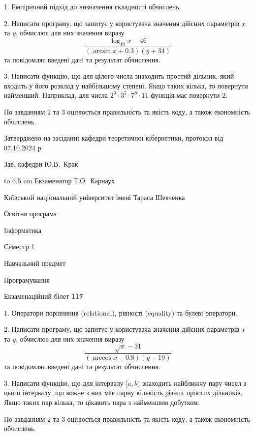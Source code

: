 \documentclass[12pt, ukrainian]{article}
\begin{document}
{%
1. Емпіричний підхід до визначення складності обчислень.%
\par
2. Написати програму, що запитує у користувача значення дійсних параметрів $x$ та $y$, обчислює для них значення виразу 
$$\frac{\log_{10} x - 46}{(\arcsin x + 0.3) (y + 34)}$$ 
та повiдомляє введенi данi та результат обчислення.

\par
3. Написати функцію, що для цілого числа знаходить простий дільник, який входить у його розклад у найбільшому степені. Якщо таких кілька, то повернути найменший. Наприклад, для числа $2^{9}{\cdot}3^5{\cdot}7^9{\cdot}11$ функція має повернути $2$.

По завданням 2 та 3 оцінюється правильність та якість коду, а також економність обчислень.

}
{\smallskip\smallskip \begin {scriptsize} Затверджено на засіданні кафедри теоретичної кібернетики, протокол   від   07.10.2024 р.\par\smallskip\smallskip\smallskip\smallskip
{\parbox {6.5 cm} {Зав. кафедри \dotfill Ю.В.~Крак}}\hspace {0.7cm} {\hbox to 6.5 cm { Екзаменатор \dotfill Т.О.~Карнаух}} \end{scriptsize}}
\vspace{0.9cm}
{{\begin {scriptsize}\par
{ \center  Київський національний університет імені Тараса Шевченка \par}
{\parbox {5 cm}{Освітня програма \hfill}{\parbox {7 cm}{Інформатика\hfill}}\parbox {6 cm}{\hfill Семестр 1}}\par
{\parbox {5 cm} {Навчальний предмет \hfill}\parbox {7 cm}{Програмування \hfill}\parbox {6cm}{\hfill}\par}\vspace{-15pt} \end{scriptsize}}{\center Екзаменаційний білет \No \textbf { 117 }\par}}
{%
1. Оператори порівняння (relational), рівності (equality) та булеві оператори.%
\par
2. Написати програму, що запитує у користувача значення дійсних параметрів $x$ та $y$, обчислює для них значення виразу 
$$\frac{\sqrt x - 31}{(\arccos x - 0.8) (y - 19)}$$ 
та повiдомляє введенi данi та результат обчислення.

\par
3. Написати функцію, що для інтервалу $[a, b)$ знаходить найближчу пару чисел з цього інтервалу, що кожне з них має парну кількість різних простих дільників. Якщо таких пар кілька, то цікавить пара з найменшим добутком.

По завданням 2 та 3 оцінюється правильність та якість коду, а також економність обчислень.

}
\end{document}
